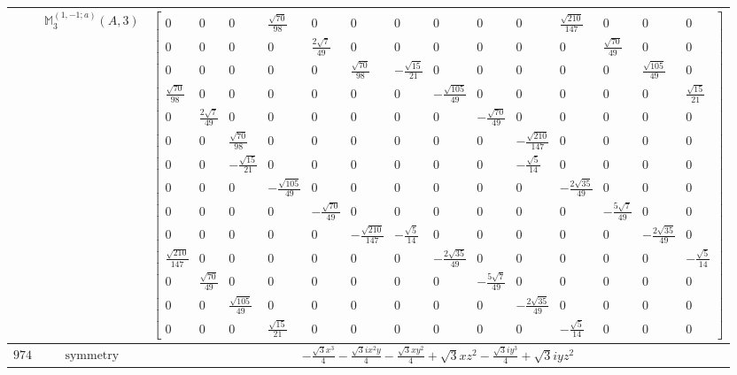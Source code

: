 \documentclass[fleqn,8pt,landscape]{jsarticle}
\begin{document}
\begin{longtable}{ccc}
$  $ & $ \mathbb{M}_{3}^{(1,-1;a)}(A,3) $ & $ \begin{bmatrix} 0 & 0 & 0 & \frac{\sqrt{70}}{98} & 0 & 0 & 0 & 0 & 0 & 0 & \frac{\sqrt{210}}{147} & 0 & 0 & 0 \\ 0 & 0 & 0 & 0 & \frac{2 \sqrt{7}}{49} & 0 & 0 & 0 & 0 & 0 & 0 & \frac{\sqrt{70}}{49} & 0 & 0 \\ 0 & 0 & 0 & 0 & 0 & \frac{\sqrt{70}}{98} & - \frac{\sqrt{15}}{21} & 0 & 0 & 0 & 0 & 0 & \frac{\sqrt{105}}{49} & 0 \\ \frac{\sqrt{70}}{98} & 0 & 0 & 0 & 0 & 0 & 0 & - \frac{\sqrt{105}}{49} & 0 & 0 & 0 & 0 & 0 & \frac{\sqrt{15}}{21} \\ 0 & \frac{2 \sqrt{7}}{49} & 0 & 0 & 0 & 0 & 0 & 0 & - \frac{\sqrt{70}}{49} & 0 & 0 & 0 & 0 & 0 \\ 0 & 0 & \frac{\sqrt{70}}{98} & 0 & 0 & 0 & 0 & 0 & 0 & - \frac{\sqrt{210}}{147} & 0 & 0 & 0 & 0 \\ 0 & 0 & - \frac{\sqrt{15}}{21} & 0 & 0 & 0 & 0 & 0 & 0 & - \frac{\sqrt{5}}{14} & 0 & 0 & 0 & 0 \\ 0 & 0 & 0 & - \frac{\sqrt{105}}{49} & 0 & 0 & 0 & 0 & 0 & 0 & - \frac{2 \sqrt{35}}{49} & 0 & 0 & 0 \\ 0 & 0 & 0 & 0 & - \frac{\sqrt{70}}{49} & 0 & 0 & 0 & 0 & 0 & 0 & - \frac{5 \sqrt{7}}{49} & 0 & 0 \\ 0 & 0 & 0 & 0 & 0 & - \frac{\sqrt{210}}{147} & - \frac{\sqrt{5}}{14} & 0 & 0 & 0 & 0 & 0 & - \frac{2 \sqrt{35}}{49} & 0 \\ \frac{\sqrt{210}}{147} & 0 & 0 & 0 & 0 & 0 & 0 & - \frac{2 \sqrt{35}}{49} & 0 & 0 & 0 & 0 & 0 & - \frac{\sqrt{5}}{14} \\ 0 & \frac{\sqrt{70}}{49} & 0 & 0 & 0 & 0 & 0 & 0 & - \frac{5 \sqrt{7}}{49} & 0 & 0 & 0 & 0 & 0 \\ 0 & 0 & \frac{\sqrt{105}}{49} & 0 & 0 & 0 & 0 & 0 & 0 & - \frac{2 \sqrt{35}}{49} & 0 & 0 & 0 & 0 \\ 0 & 0 & 0 & \frac{\sqrt{15}}{21} & 0 & 0 & 0 & 0 & 0 & 0 & - \frac{\sqrt{5}}{14} & 0 & 0 & 0 \end{bmatrix} $ \\ \hline
$ 974 $ & $ \text{symmetry} $ & $ - \frac{\sqrt{3} x^{3}}{4} - \frac{\sqrt{3} i x^{2} y}{4} - \frac{\sqrt{3} x y^{2}}{4} + \sqrt{3} x z^{2} - \frac{\sqrt{3} i y^{3}}{4} + \sqrt{3} i y z^{2} $ \\

\end{longtable}
\end{document}
